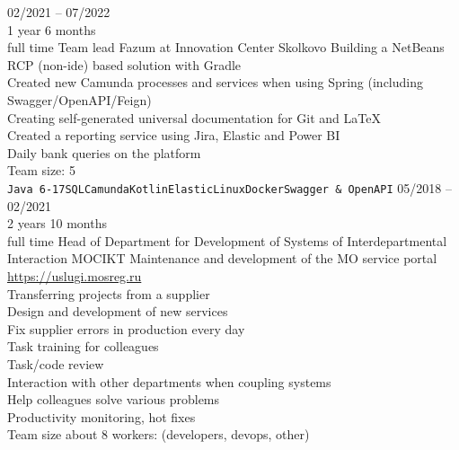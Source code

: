 


\begin{entrylist}
    \entry
    {02/2021 -- 07/2022\\\footnotesize{1 year 6 months\\full time}}
    {Team lead}
    {Fazum at Innovation Center Skolkovo}
    {
        Building a NetBeans RCP (non-ide) based solution with Gradle \\
    Created new Camunda processes and services when using Spring (including Swagger/OpenAPI/Feign) \\
    Creating self-generated universal documentation for Git and LaTeX \\
    Created a reporting service using Jira, Elastic and Power BI \\
    Daily bank queries on the platform \\
    Team size: 5 \\
    \texttt{Java 6-17}\slashsep\texttt{SQL}\slashsep\texttt{Camunda}\slashsep\texttt{Kotlin}\slashsep\texttt{Elastic}\slashsep\texttt{Linux}\slashsep\texttt{Docker}\slashsep\texttt{Swagger \& OpenAPI}
    }
    \entry
    {05/2018 -- 02/2021\\\footnotesize{2 years 10 months\\full time}}
    {Head of Department for Development of Systems of Interdepartmental Interaction}
    {MOCIKT}
    {
        Maintenance and development of the MO service portal \url{https://uslugi.mosreg.ru} \\
        Transferring projects from a supplier \\
        Design and development of new services \\
        Fix supplier errors in production every day \\
        Task training for colleagues \\
        Task/code review \\
        Interaction with other departments when coupling systems \\
        Help colleagues solve various problems \\
        Productivity monitoring, hot fixes \\
    Team size about 8 workers: (developers, devops, other) \\
}
\end{entrylist}
